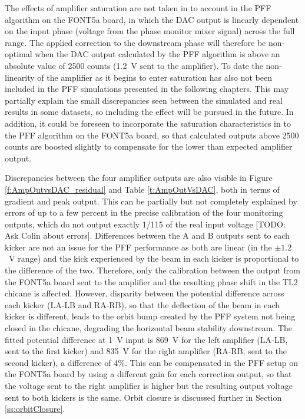 The effects of amplifier saturation are not taken in to account in the PFF algorithm on the FONT5a board, in which the DAC output is linearly dependent on the input phase (voltage from the phase monitor mixer signal) across the full range. The applied correction to the downstream phase will therefore be non-optimal when the DAC output calculated by the PFF algorithm is above an absolute value of 2500 counts (1.2~V sent to the amplifier). To date the non-linearity of the amplifier as it begins to enter saturation has also not been included in the PFF simulations presented in the following chapters. This may partially explain the small discrepancies seen between the simulated and real results in some datasets, so including the effect will be pursued in the future. In addition, it could be foreseen to incorporate the saturation characteristics in to the PFF algorithm on the FONT5a board, so that calculated outputs above 2500 counts are boosted slightly to compensate for the lower than expected amplifier output.

Discrepancies between the four amplifier outputs are also visible in Figure \ref{f:AmpOutvsDAC_residual} and Table \ref{t:AmpOutVsDAC}, both in terms of gradient and peak output. This can be partially but not completely explained by errors of up to a few percent in the precise calibration of the four monitoring outputs, which do not output exactly 1/115 of the real input voltage [TODO: Ask Colin about errors]. Differences between the A and B outputs sent to each kicker are not an issue for the PFF performance as both are linear (in the \(\pm1.2\)~V range) and the kick experienced by the beam in each kicker is proportional to the difference of the two. Therefore, only the calibration between the output from the FONT5a board sent to the amplifier and the resulting phase shift in the TL2 chicane is affected. However, disparity between the potential difference across each kicker (LA-LB and RA-RB), so that the deflection of the beam in each kicker is different, leads to the orbit bump created by the PFF system not being closed in the chicane, degrading the horizontal beam stability downstream. The fitted potential difference at 1~V input is 869~V for the left amplifier (LA-LB, sent to the first kicker) and 835~V for the right amplifier (RA-RB, sent to the second kicker), a difference of 4\%. This can be compensated in the PFF setup on the FONT5a board by using a different gain for each correction output, so that the voltage sent to the right amplifier is higher but the resulting output voltage sent to both kickers is the same. Orbit closure is discussed further in Section \ref{ss:orbitClosure}.


